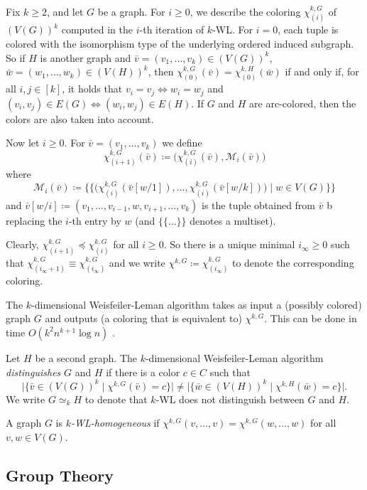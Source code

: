 \PassOptionsToPackage{dvipsnames,svgnames}{xcolor}\documentclass[10pt,a4paper]{article}
\newcommand{\CM}{{\mathcal M}}
\newcommand{\Bigmid}{\;\Big|\;}
\newcommand{\WL}[2]{\chi^{#1,#2}}
\newcommand{\WLit}[3]{\chi_{(#2)}^{#1,#3}}
\begin{document}
Fix $k \geq 2$, and let $G$ be a graph.
For $i \geq 0$, we describe the coloring $\WLit{k}{i}{G}$ of $(V(G))^k$ computed in the $i$-th iteration of $k$-WL.
For $i = 0$, each tuple is colored with the isomorphism type of the underlying ordered induced subgraph.
So if $H$ is another graph and $\bar v = (v_1,\dots,v_k) \in (V(G))^k$, $\bar w = (w_1,\dots,w_k) \in (V(H))^k$,
then $\WLit{k}{0}{G}(\bar v) = \WLit{k}{0}{H}(\bar w)$ if and only if, for all $i,j \in [k]$, it holds that $v_i = v_j \Leftrightarrow w_i = w_j$ and $(v_i,v_j) \in E(G) \Leftrightarrow (w_i,w_j) \in E(H)$.
If $G$ and $H$ are arc-colored, then the colors are also taken into account.

Now let $i \geq 0$.
For $\bar v = (v_1,\dots,v_k)$ we define
\[\WLit{k}{i+1}{G}(\bar v) \coloneqq \Big(\WLit{k}{i}{G}(\bar v), \CM_{i}(\bar v)\Big)\]
where
\[\CM_i(\bar v) \coloneqq \Big\{\!\Big\{ \big(\WLit{k}{i}{G}(\bar v[w/1]),\dots,\WLit{k}{i}{G}(\bar v[w/k])\big) \Bigmid w \in V(G) \Big\}\!\Big\}\]
and $\bar v[w/i] \coloneqq (v_1,\dots,v_{i-1},w,v_{i+1},\dots,v_k)$ is the tuple obtained from $\bar v$ b replacing the $i$-th entry by $w$ (and $\{\!\{\dots\}\!\}$ denotes a multiset).

Clearly, $\WLit{k}{i+1}{G} \preceq \WLit{k}{i}{G}$ for all $i \geq 0$.
So there is a unique minimal $i_\infty \geq 0$ such that $\WLit{k}{i_\infty+1}{G} \equiv \WLit{k}{i_\infty}{G}$ and we write $\WL{k}{G} \coloneqq \WLit{k}{i_\infty}{G}$ to denote the corresponding coloring.

The $k$-dimensional Weisfeiler-Leman algorithm takes as input a (possibly colored) graph $G$ and outputs (a coloring that is equivalent to) $\WL{k}{G}$.
This can be done in time $O(k^2n^{k+1} \log n)$ \cite{ImmermanL90}.

Let $H$ be a second graph.
The $k$-dimensional Weisfeiler-Leman algorithm \emph{distinguishes} $G$ and $H$ if there is a color $c \in C$ such that
\[\Big|\Big\{ \bar v \in (V(G))^k \Bigmid \WL{k}{G}(\bar v) = c \Big\}\Big| \neq \Big|\Big\{ \bar w \in (V(H))^k \Bigmid \WL{k}{H}(\bar w) = c \Big\}\Big|.\]
We write $G \simeq_k H$ to denote that $k$-WL does not distinguish between $G$ and $H$.

A graph $G$ is \emph{$k$-WL-homogeneous} if $\WL{k}{G}(v,\dots,v) = \WL{k}{G}(w,\dots,w)$ for all $v,w\in V(G)$.


\subsection{Group Theory}
\label{sec:groups}
\end{document}
